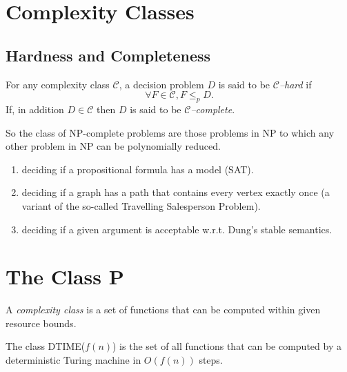 \section{Complexity Classes}



\subsection{Hardness and Completeness}

For any complexity class $\mathcal{C}$, 
a decision problem $D$ is said to be \textit{$\mathcal{C}$--hard} if 
\[
    \forall F \in \mathcal{C}, F \leq_p D.
\]
If, 
in addition $D \in \mathcal{C}$ then $D$ is said to be \textit{$\mathcal{C}$--complete}.



So the class of NP-complete problems are those problems in NP to which any
other problem in NP can be polynomially reduced.


\begin{enumerate}[itemsep=5pt,parsep=5pt,leftmargin=3em,topsep=5pt,label=(\arabic*)] %
    \item 
    deciding if a propositional formula has a model (SAT).
    
    \item 
    deciding if a graph has a path that contains every vertex exactly once (a variant of the so-called Travelling Salesperson Problem).

    \item 
    deciding if a given argument is acceptable w.r.t. Dung's stable semantics.
\end{enumerate}






\section{The Class \textsf{P}} 

A \textit{complexity class} is a set of functions that can be computed within given resource bounds.



\begin{df}
    The class \textsf{DTIME}($f(n)$) is the set of all functions that can be computed by a deterministic Turing machine in $O(f(n))$ steps.
\end{df}

